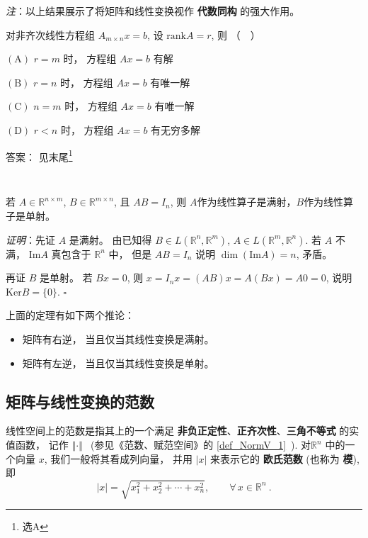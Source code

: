 \textsl{注}：以上结果展示了将矩阵和线性变换视作 \textbf{代数同构} 的强大作用。

\begin{exercise}{}
对非齐次线性方程组 $A_{m\times n}x=b$, 设 $\mathrm{rank}A=r$, 则 （$\quad$）

$(\mathrm{A})$ $r=m$ 时， 方程组 $Ax=b$ 有解

$(\mathrm{B})$ $r=n$ 时， 方程组 $Ax=b$ 有唯一解

$(\mathrm{C})$ $n=m$ 时， 方程组 $Ax=b$ 有唯一解

$(\mathrm{D})$ $r<n$ 时， 方程组 $Ax=b$ 有无穷多解

答案： 见末尾\footnote{选$\mathrm{A}$}
\end{exercise}
\verb| |

\begin{theorem}{}
若 $A\in\mathbb{R}^{n\times m}$, $B\in\mathbb{R}^{m\times n}$, 且 $AB=I_n$, 则 $A$作为线性算子是满射，$B$作为线性算子是单射。

\textsl{证明}：先证 $A$ 是满射。 由已知得 $B\in L(\mathbb{R}^{n},\mathbb{R}^{m})$, $A\in L(\mathbb{R}^{m},\mathbb{R}^{n})$.
若 $A$ 不满， $\mathrm{Im}A$ 真包含于 $\mathbb{R}^{n}$ 中， 但是 $AB=I_{n}$
说明 $\dim(\mathrm{Im}A)=n$, 矛盾。 

再证 $B$ 是单射。 若 $Bx=0$, 则 $x=I_{n}x=(AB)x=A(Bx)=A0=0$, 说明 $\mathrm{Ker}B=\{0\}$.
$\square$
\end{theorem}

上面的定理有如下两个推论：

\begin{itemize}
\item 矩阵有右逆， 当且仅当其线性变换是满射。 \end{itemize}

\begin{itemize}
\item 矩阵有左逆， 当且仅当其线性变换是单射。 
\end{itemize}




\subsection{矩阵与线性变换的范数}
线性空间上的范数是指其上的一个满足 \textbf{非负正定性}、\textbf{正齐次性}、\textbf{三角不等式} 的实值函数， 记作 $\left\Vert \cdot\right\Vert ~~$ 
(参见《范数、赋范空间》的 \autoref{def_NormV_1}~). 对$\mathbb{R}^n$ 中的一个向量 $x$, 我们一般将其看成列向量， 并用 $|x|$ 来表示它的 \textbf{欧氏范数} (也称为 \textbf{模}), 即
$$ |x|=\sqrt{x_1^2+x^2_2+\cdots+x_n^2}, \qquad\forall \,x\in \mathbb{R}^n~.
$$

